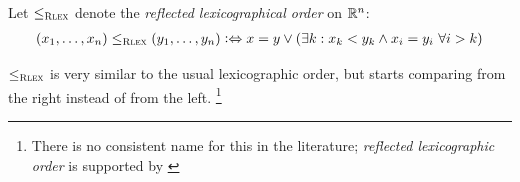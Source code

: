 \documentclass[a4paper]{scrreprt}
\begin{document}
%        

    \begin{defn}
        Let $\leq_{\textsc{Rlex}}$ denote the \emph{reflected lexicographical order} on $\mathbb{R}^n$:
        \begin{gather*}
            (x_1, \dots, x_n) \leq_{\textsc{Rlex}} (y_1, \dots, y_n) \mathrel{\vcentcolon\Leftrightarrow} x = y \vee (\exists k: x_k < y_k \wedge x_i = y_i ~\forall i > k)
        \end{gather*}
    \end{defn}
    $\leq_{\textsc{Rlex}}$ is very similar to the usual lexicographic order, but starts comparing from the right instead of from the left. \footnote{There is no consistent name for this in the literature; \emph{reflected lexicographic order} is supported by \cite{bib:oeisRefLexOrder}}
    
\end{document}
